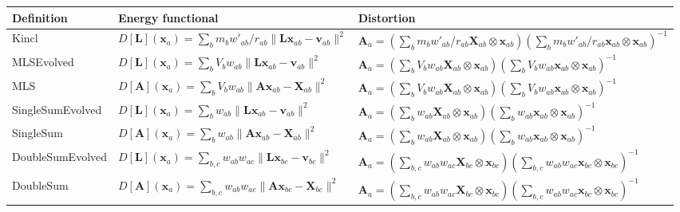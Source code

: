 \documentclass[oneside, a4paper, onecolumn, 11pt]{article}
\renewcommand{\AA}{\mathbf{A}}
\newcommand{\vv}{\mathbf{v}}
\newcommand{\xx}{\mathbf{x}}
\newcommand{\XX}{\mathbf{X}}
\newcommand{\LL}{\mathbf{L}}
\begin{document}
\begin{table}
\centering
\footnotesize
\setlength{\tabcolsep}{4pt}

\begin{tabular}{@{}L{3.2cm} C{7cm} C{7cm}@{}}
\toprule
\textbf{Definition} & \textbf{Energy functional} & \textbf{Distortion} \\
\midrule
Kincl &
$D[\LL](\xx_a) = \sum_b m_{b} w'_{ab}/r_{ab} \|\LL \xx_{ab} - \vv_{ab}\|^2$ &
$\AA_{a} =\left( \sum_{b} m_{b} w'_{ab}/r_{ab} \XX_{ab}\otimes \xx_{ab}\right) \left( \sum_{b} m_{b} w'_{ab}/r_{ab} \xx_{ab}\otimes \xx_{ab} \right)^{-1}$ \\[6pt]
MLSEvolved &
$D[\LL](\xx_a) = \sum_{b} V_{b} w_{ab} \|\LL \xx_{ab} - \vv_{ab}\|^2$ &
$\AA_{a} =\left( \sum_{b} V_{b} w_{ab} \XX_{ab}\otimes \xx_{ab}\right) \left( \sum_{b} V_{b} w_{ab} \xx_{ab}\otimes \xx_{ab} \right)^{-1}$ \\[6pt]
MLS &
$D[\AA](\xx_a) = \sum_{b} V_{b} w_{ab} \|\AA \xx_{ab} - \XX_{ab}\|^2$ &
$\AA_{a} =\left( \sum_{b} V_{b}w_{ab} \XX_{ab}\otimes \xx_{ab}\right) \left( \sum_{b} V_{b} w_{ab} \xx_{ab}\otimes \xx_{ab} \right)^{-1}$ \\[6pt]
SingleSumEvolved &
$D[\LL](\xx_a) = \sum_{b} w_{ab} \|\LL \xx_{ab} - \vv_{ab}\|^2$ &
$\AA_{a} =\left( \sum_{b}w_{ab} \XX_{ab}\otimes \xx_{ab}\right) \left( \sum_{b}w_{ab} \xx_{ab}\otimes \xx_{ab} \right)^{-1}$ \\[6pt]
SingleSum &
$D[\AA](\xx_a) = \sum_{b} w_{ab} \|\AA \xx_{ab} - \XX_{ab}\|^2$ &
$\AA_{a} =\left( \sum_{b}w_{ab} \XX_{ab}\otimes \xx_{ab}\right) \left( \sum_{b}w_{ab} \xx_{ab}\otimes \xx_{ab} \right)^{-1}$ \\[6pt]
DoubleSumEvolved &
$D[\LL](\xx_a) = \sum_{b,c} w_{ab} w_{ac} \|\LL \xx_{bc} - \vv_{bc}\|^2$ &
$\AA_{a} =\left( \sum_{b, c} w_{ab} w_{ac} \XX_{bc}\otimes \xx_{bc}\right) \left( \sum_{b, c} w_{ab} w_{ac} \xx_{bc}\otimes \xx_{bc} \right)^{-1}$ \\[6pt]
DoubleSum &
$D[\AA](\xx_a) = \sum_{b,c} w_{ab} w_{ac} \|\AA \xx_{bc} - \XX_{bc}\|^2$ &
$\AA_{a} =\left( \sum_{b, c} w_{ab} w_{ac} \XX_{bc}\otimes \xx_{bc}\right) \left( \sum_{b, c} w_{ab} w_{ac}\xx_{bc}\otimes \xx_{bc} \right)^{-1}$ \\
\bottomrule
\end{tabular}

\vspace{1cm}


\end{table}
\end{document}
